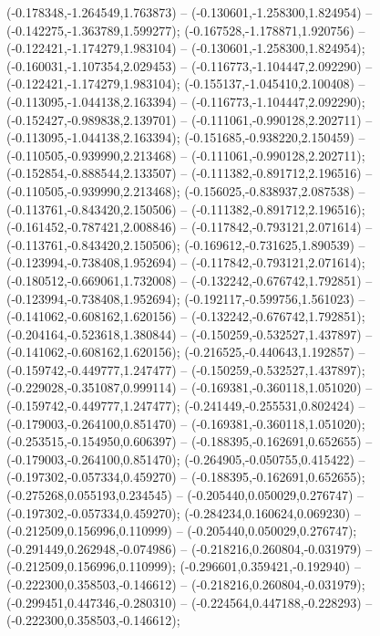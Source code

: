  (-0.178348,-1.264549,1.763873) -- (-0.130601,-1.258300,1.824954) -- (-0.142275,-1.363789,1.599277);
 (-0.167528,-1.178871,1.920756) -- (-0.122421,-1.174279,1.983104) -- (-0.130601,-1.258300,1.824954);
 (-0.160031,-1.107354,2.029453) -- (-0.116773,-1.104447,2.092290) -- (-0.122421,-1.174279,1.983104);
 (-0.155137,-1.045410,2.100408) -- (-0.113095,-1.044138,2.163394) -- (-0.116773,-1.104447,2.092290);
 (-0.152427,-0.989838,2.139701) -- (-0.111061,-0.990128,2.202711) -- (-0.113095,-1.044138,2.163394);
 (-0.151685,-0.938220,2.150459) -- (-0.110505,-0.939990,2.213468) -- (-0.111061,-0.990128,2.202711);
 (-0.152854,-0.888544,2.133507) -- (-0.111382,-0.891712,2.196516) -- (-0.110505,-0.939990,2.213468);
 (-0.156025,-0.838937,2.087538) -- (-0.113761,-0.843420,2.150506) -- (-0.111382,-0.891712,2.196516);
 (-0.161452,-0.787421,2.008846) -- (-0.117842,-0.793121,2.071614) -- (-0.113761,-0.843420,2.150506);
 (-0.169612,-0.731625,1.890539) -- (-0.123994,-0.738408,1.952694) -- (-0.117842,-0.793121,2.071614);
 (-0.180512,-0.669061,1.732008) -- (-0.132242,-0.676742,1.792851) -- (-0.123994,-0.738408,1.952694);
 (-0.192117,-0.599756,1.561023) -- (-0.141062,-0.608162,1.620156) -- (-0.132242,-0.676742,1.792851);
 (-0.204164,-0.523618,1.380844) -- (-0.150259,-0.532527,1.437897) -- (-0.141062,-0.608162,1.620156);
 (-0.216525,-0.440643,1.192857) -- (-0.159742,-0.449777,1.247477) -- (-0.150259,-0.532527,1.437897);
 (-0.229028,-0.351087,0.999114) -- (-0.169381,-0.360118,1.051020) -- (-0.159742,-0.449777,1.247477);
 (-0.241449,-0.255531,0.802424) -- (-0.179003,-0.264100,0.851470) -- (-0.169381,-0.360118,1.051020);
 (-0.253515,-0.154950,0.606397) -- (-0.188395,-0.162691,0.652655) -- (-0.179003,-0.264100,0.851470);
 (-0.264905,-0.050755,0.415422) -- (-0.197302,-0.057334,0.459270) -- (-0.188395,-0.162691,0.652655);
 (-0.275268,0.055193,0.234545) -- (-0.205440,0.050029,0.276747) -- (-0.197302,-0.057334,0.459270);
 (-0.284234,0.160624,0.069230) -- (-0.212509,0.156996,0.110999) -- (-0.205440,0.050029,0.276747);
 (-0.291449,0.262948,-0.074986) -- (-0.218216,0.260804,-0.031979) -- (-0.212509,0.156996,0.110999);
 (-0.296601,0.359421,-0.192940) -- (-0.222300,0.358503,-0.146612) -- (-0.218216,0.260804,-0.031979);
 (-0.299451,0.447346,-0.280310) -- (-0.224564,0.447188,-0.228293) -- (-0.222300,0.358503,-0.146612);

